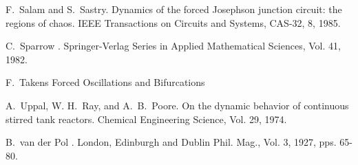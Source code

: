 \begin{thebibliography}{99}
F.~Salam and S.~Sastry.
\newblock Dynamics of the forced Josephson junction circuit: the
regions of chaos.
\newblock IEEE Transactions on Circuits and Systems, CAS-32, 8, 1985.

C.~Sparrow
.
\newblock Springer-Verlag Series in Applied Mathematical Sciences, Vol. 41, 1982.

F.~Takens
\newblock Forced Oscillations and Bifurcations

A.~Uppal, W. H.~Ray, and A.~B.~Poore.
\newblock On the dynamic behavior of continuous stirred tank reactors.
\newblock Chemical Engineering Science, Vol. 29, 1974.

B.~van der Pol
.
\newblock London, Edinburgh and Dublin Phil. Mag., Vol. 3, 1927, pps. 65-80.

\end{thebibliography}

